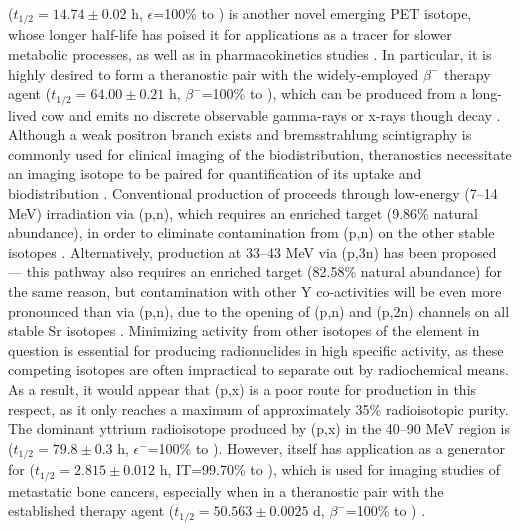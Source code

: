 \documentclass[%
 reprint,
superscriptaddress,
onecolumn,
linenumbers,
notitlepage,
 amsmath,amssymb,
 aps,
prc,
]{revtex4-1}
\newcommand{\comment}[1]{\todo[color=blue!20!white,inline]{ASV: #1}}
\begin{document}
 ($t_{1/2}=14.74\pm0.02$ h, $\epsilon$=100\% to   \cite{NEGRET20151}) is another novel  emerging  PET isotope, whose longer half-life has poised it for applications as a tracer for slower metabolic processes, as well as in   pharmacokinetics studies \cite{Valdovinos2017,Nickles2003,Qaim2008,QaimSyedM2011}.
In particular, it is highly desired to form a theranostic pair with the widely-employed $\beta^-$ therapy agent  ($t_{1/2}=64.00\pm0.21$ h, $\beta^-$=100\% to  \cite{Browne1997}), which can be produced from a long-lived  cow and emits no discrete observable gamma-rays or x-rays though decay \cite{Herzog1993}.
Although a weak positron branch exists and bremsstrahlung scintigraphy is commonly used for clinical imaging of the  biodistribution, theranostics  necessitate an imaging isotope to be paired for quantification of its uptake and biodistribution  \cite{Nickles2004}.
Conventional production of  proceeds through low-energy (7--14 MeV) irradiation via (p,n), which requires an enriched   target (9.86\% natural abundance), in order to eliminate contamination from (p,n) on the other stable  isotopes  \cite{Rosch1993}.
Alternatively, production at 33--43 MeV via (p,3n) has been proposed --- this pathway also requires an enriched target (82.58\% natural abundance) for the same reason, but contamination with other Y co-activities will be even more pronounced than via (p,n), due to the opening of (p,n) and (p,2n) channels on all stable Sr isotopes \cite{doi:10.1139/v67-193,levkovski1991cross}.
Minimizing activity from other isotopes of the element in question is essential for producing radionuclides in high specific activity, as these competing isotopes are often impractical to separate out by radiochemical means.
As a result, it would appear that (p,x) is a poor route for   production in this respect, as it only reaches a maximum of approximately 35\% radioisotopic purity.
The  dominant yttrium radioisotope produced by  (p,x) in the 40--90 MeV region is   ($t_{1/2}=79.8\pm0.3$ h, $\epsilon^-$=100\% to  \cite{Johnson2015}).
However,   itself has application as a generator for   ($t_{1/2}=2.815\pm0.012$ h, IT=99.70\% to  \cite{Johnson2015}), which is used for imaging studies of metastatic bone cancers, especially when in a theranostic pair with the established therapy agent  ($t_{1/2}=50.563\pm0.0025$ d, $\beta^-$=100\% to  \cite{Singh2013}) \cite{Kiselev1974,Kandil2009}.
\end{document}
